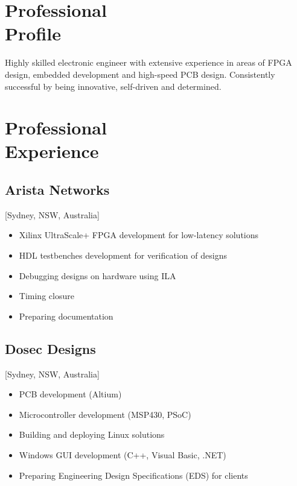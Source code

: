 \documentclass{mycv}
\begin{document}
\maketitle%

\section{Professional \\ Profile}

Highly skilled electronic engineer with extensive experience in areas of FPGA design, embedded development and high-speed PCB design. 
Consistently successful by being innovative, self-driven and determined.

\section{Professional \\ Experience}

\subsection{Arista Networks}[Sydney, NSW, Australia]
\begin{positions}
\end{positions}

\begin{itemize}[noitemsep]
  \item Xilinx UltraScale+ FPGA development for low-latency solutions
  \item HDL testbenches development for verification of designs
  \item Debugging designs on hardware using ILA
  \item Timing closure
  \item Preparing documentation
\end{itemize}

\subsection{Dosec Designs}[Sydney, NSW, Australia]
\begin{positions}
\end{positions}

\begin{itemize}[noitemsep]
  \item PCB development (Altium)
  \item Microcontroller development (MSP430, PSoC)
  \item Building and deploying Linux solutions
  \item Windows GUI development (C++, Visual Basic, .NET)
  \item Preparing Engineering Design Specifications (EDS) for clients
\end{itemize}
\end{document}
